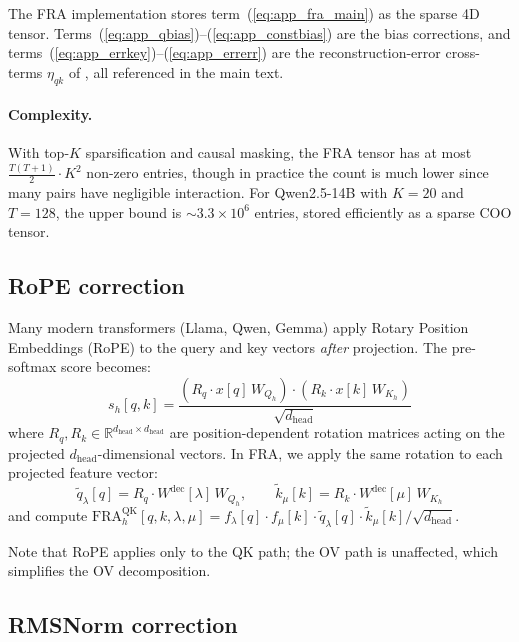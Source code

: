 \documentclass{article} %
\theoremstyle{plain}
\theoremstyle{definition}
\theoremstyle{remark}
\newcommand{\Wdec}{W^{\mathrm{dec}}}
\newcommand{\dhead}{d_{\mathrm{head}}}
\newcommand{\flambda}{f_\lambda}
\newcommand{\fmu}{f_\mu}
\newcommand{\RR}{\mathbb{R}}
\begin{document}
The FRA implementation stores term~(\ref{eq:app_fra_main}) as the sparse 4D tensor. Terms~(\ref{eq:app_qbias})--(\ref{eq:app_constbias}) are the bias corrections, and terms~(\ref{eq:app_errkey})--(\ref{eq:app_errerr}) are the reconstruction-error cross-terms $\eta_{qk}$ of , all referenced in the main text.

\paragraph{Complexity.} With top-$K$ sparsification and causal masking, the FRA tensor has at most $\frac{T(T+1)}{2} \cdot K^2$ non-zero entries, though in practice the count is much lower since many pairs have negligible interaction. For Qwen2.5-14B with $K{=}20$ and $T{=}128$, the upper bound is ${\sim}3.3 \times 10^6$ entries, stored efficiently as a sparse COO tensor.

\subsection{RoPE correction}
\label{app:rope}

Many modern transformers (Llama, Qwen, Gemma) apply Rotary Position Embeddings (RoPE) to the query and key vectors \emph{after} projection. The pre-softmax score becomes:
\begin{equation}
    s_h[q,k] = \frac{\left(R_q \cdot x[q]\,W_{Q_h} \right) \cdot \left( R_k \cdot x[k]\,W_{K_h} \right)}{\sqrt{\dhead}}
\end{equation}
where $R_q, R_k \in \RR^{\dhead \times \dhead}$ are position-dependent rotation matrices acting on the projected $\dhead$-dimensional vectors. In FRA, we apply the same rotation to each projected feature vector:
\begin{equation}
    \tilde{q}_\lambda[q] = R_q \cdot \Wdec[\lambda]\,W_{Q_h}, \qquad \tilde{k}_\mu[k] = R_k \cdot \Wdec[\mu]\,W_{K_h}
\end{equation}
and compute $\mathrm{FRA}^{\mathrm{QK}}_h[q,k,\lambda,\mu] = \flambda[q] \cdot \fmu[k] \cdot \tilde{q}_\lambda[q] \cdot \tilde{k}_\mu[k] / \sqrt{\dhead}$.

Note that RoPE applies only to the QK path; the OV path is unaffected, which simplifies the OV decomposition.

\subsection{RMSNorm correction}
\label{app:rms}
\end{document}
